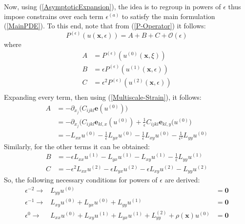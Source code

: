 Now, using (\ref{AsymptoticExpansion}), the idea is to regroup in powers of $\epsilon$ thus impose constrains over each term $\epsilon^{(a)}$ to satisfy the main formulation (\ref{MainPDE}). To this end, note that from (\ref{P-Operator}) it follows:
\begin{equation*}
    P^{(\epsilon)}(u(\mathbf{x},\epsilon)) = A + B + C + \mathcal{O}(\epsilon)
\end{equation*}
where 
\begin{equation*}
    \begin{array}{cc}
        A &= P^{(\epsilon)}(u^{(0)}(\mathbf{x},\xi)) \\
        B &= \epsilon P^{(\epsilon)}(u^{(1)}(\mathbf{x},\epsilon)) \\
        C &= \epsilon^2 P^{(\epsilon)}(u^{(2)}(\mathbf{x},\epsilon)) \\
    \end{array}
\end{equation*}
Expanding every term, then using (\ref{Multiscale-Strain}), it follows:
\begin{align*}
    A &= - \partial_{x_j} \big( C_{ijkl}\mathbf{e}(u^{(0)}) \big) \\
    &=- \partial_{x_j} \big( C_{ijkl} \mathbf{e}_{kl,x} (u^{(0)}) + \frac{1}{\epsilon}C_{ijkl}\mathbf{e}_{kl,y}(u^{(0)} \big)\\
    &= - L_{xx}u^{(0)} - \frac{1}{\epsilon} L_{yx}u^{(0)} - \frac{1}{\epsilon} L_{xy}u^{(0)} - \frac{1}{\epsilon^2}L_{yy}u^{(0)}
\end{align*}
Similarly, for the other terms it can be obtained:
\begin{align*}
    B &= -\epsilon L_{xx} u^{(1)} - L_{yx}u^{(1)} - L_{xy} u^{(1)} - \frac{1}{\epsilon} L_{yy}u^{(1)} \\
    C &= -\epsilon^2 L_{xx} u^{(2)} - \epsilon L_{yx}u^{(2)} - \epsilon L_{xy} u^{(2)} - L_{yy}u^{(2)} 
\end{align*}
So, the following necessary conditions for powers of $\epsilon$ are derived:
\begin{equation}
    \label{Epsilon-Separation}
    \begin{array}{ccc}
        \epsilon^{-2} \longrightarrow & L_{yy} u^{(0)} &= \mathbf{0} \\
        \epsilon^{-1} \longrightarrow & L_{xy}u^{(0)} + L_{yx} u^{(0)} + L_{yy} u^{(1)} &= \mathbf{0} \\
        \epsilon^{0} \longrightarrow & L_{xx} u^{(0)} + L_{xy} u^{(1)} + L_{yx} u^{(1)} + L_{yy}^{(2)} + \rho(\mathbf{x}) u^{(0)} &= \mathbf{0}
    \end{array}
\end{equation}

